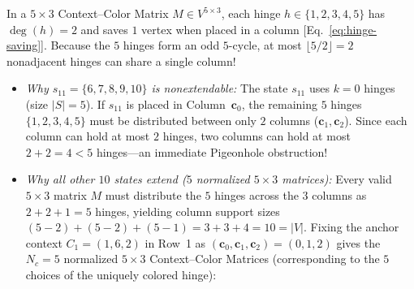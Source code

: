 \documentclass[aps,pra,reprint,superscriptaddress,longbibliography,nofootinbib,floatfix,10pt]{revtex4-2}
\theoremstyle{definition}\newtheorem{definition}[theorem]{Definition}
\theoremstyle{remark}\newtheorem{remark}[theorem]{Remark}
\begin{document}
In a $5\times 3$ Context--Color Matrix $M\in V^{5\times 3}$, each hinge $h\in\{1,2,3,4,5\}$ has $\deg(h)=2$ and saves $1$ vertex when placed in a column [Eq.~\eqref{eq:hinge-saving}]. Because the $5$ hinges form an odd $5$-cycle, at most $\lfloor 5/2\rfloor=2$ nonadjacent hinges can share a single column!
\begin{itemize}
\item \emph{Why $s_{11}=\{6,7,8,9,10\}$ is nonextendable:} The state $s_{11}$ uses $k=0$ hinges (size $|S|=5$). If $s_{11}$ is placed in Column~$\mathbf{c}_0$, the remaining $5$ hinges $\{1,2,3,4,5\}$ must be distributed between only $2$ columns ($\mathbf{c}_1,\mathbf{c}_2$). Since each column can hold at most $2$ hinges, two columns can hold at most $2+2=4<5$ hinges—an immediate Pigeonhole obstruction!
\item \emph{Why all other $10$ states extend ($5$ normalized $5\times3$ matrices):} Every valid $5\times 3$ matrix $M$ must distribute the $5$ hinges across the $3$ columns as $2+2+1=5$ hinges, yielding column support sizes $(5-2)+(5-2)+(5-1)=3+3+4=10=|V|$.
Fixing the anchor context $C_1=(1,6,2)$ in Row~1 as $(\mathbf{c}_0,\mathbf{c}_1,\mathbf{c}_2)=(0,1,2)$ gives the $N_c=5$ normalized $5\times 3$ Context--Color Matrices (corresponding to the $5$ choices of the uniquely colored hinge):
\end{itemize}
\end{document}
